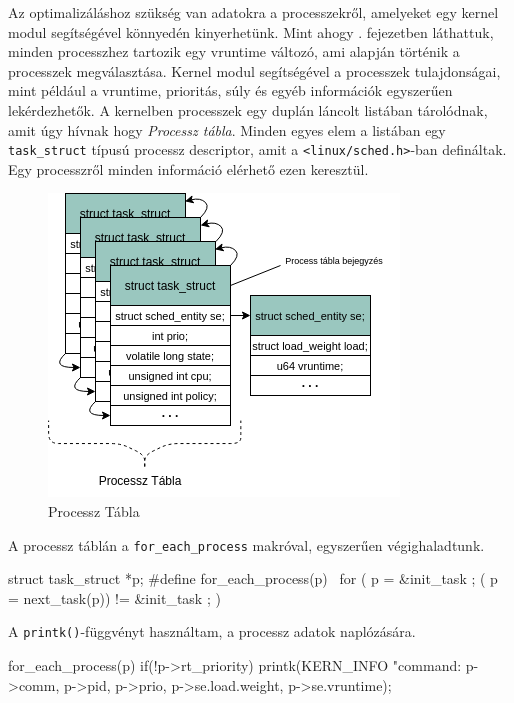 

Az optimalizáláshoz szükség van adatokra a processzekről, amelyeket egy kernel modul segítségével könnyedén kinyerhetünk.
Mint ahogy . fejezetben láthattuk, minden processzhez tartozik egy vruntime változó, ami alapján történik a processzek megválasztása. 
Kernel modul segítségével a processzek tulajdonságai, mint például a vruntime, prioritás, súly és egyéb információk egyszerűen lekérdezhetők.
A kernelben processzek egy duplán láncolt listában tárolódnak, amit úgy hívnak hogy \textit{Processz tábla}. Minden egyes elem a listában egy \texttt{task\_struct} típusú processz descriptor, amit a \texttt{<linux/sched.h>}-ban defináltak. Egy processzről minden információ elérhető ezen keresztül.

\begin{figure}[h!]
\centering
\includegraphics[scale=0.75]{images/processTable.png}
\caption{Processz Tábla}
\label{fig:structurehierarchi}
\end{figure}

\noindent A processz táblán a \texttt{for\_each\_process} makróval, egyszerűen végighaladtunk.
\begin{cpp}
struct task_struct *p;
#define for_each_process(p) \
	 for ( p = &init_task ; ( p = next_task(p)) != &init_task ; )
\end{cpp}
A \texttt{printk()}-függvényt használtam, a processz adatok naplózására.
\begin{cpp}
for_each_process(p)
    if(!p->rt_priority)
        printk(KERN_INFO
        "command: %
        p->comm, p->pid, p->prio, p->se.load.weight, p->se.vruntime);
\end{cpp}

